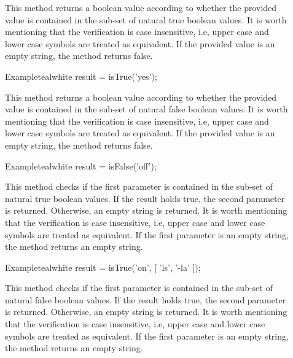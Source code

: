 \begin{description}
\item[] This method returns a boolean value according to whether the provided  value is contained in the sub-set of natural true boolean values. It is worth mentioning that the verification is case insensitive, i.e, upper case and lower case symbols are treated as equivalent. If the provided value is an empty string, the method returns false.

\begin{codebox}{Example}{teal}{\icnote}{white}
result = isTrue('yes');
\end{codebox}

\item[] This method returns a boolean value according to whether the provided  value is contained in the sub-set of natural false boolean values. It is worth mentioning that the verification is case insensitive, i.e, upper case and lower case symbols are treated as equivalent. If the provided value is an empty string, the method returns false.

\begin{codebox}{Example}{teal}{\icnote}{white}
result = isFalse('off');
\end{codebox}

\item[] This method checks if the first parameter is contained in the sub-set of natural true boolean values. If the result holds true, the second parameter is returned. Otherwise, an empty string is returned. It is worth mentioning that the verification is case insensitive, i.e, upper case and lower case symbols are treated as equivalent. If the first parameter is an empty string, the method returns an empty string.

\begin{codebox}{Example}{teal}{\icnote}{white}
result = isTrue('on', [ 'ls', '-la' ]);
\end{codebox}

\item[] This method checks if the first parameter is contained in the sub-set of natural false boolean values. If the result holds true, the second parameter is returned. Otherwise, an empty string is returned. It is worth mentioning that the verification is case insensitive, i.e, upper case and lower case symbols are treated as equivalent. If the first parameter is an empty string, the method returns an empty string.


\end{description}
